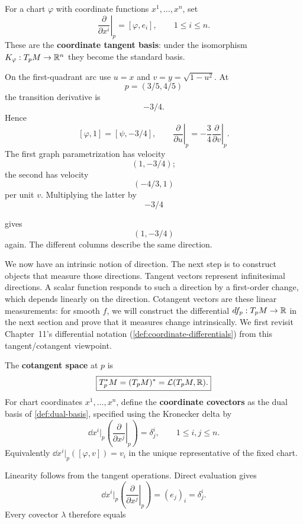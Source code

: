 
\begin{definition}
For a chart $\varphi$ with coordinate functions $x^1,\ldots,x^n$, set
\[
\left.\frac{\partial}{\partial x^i}\right|_p=[\varphi,e_i],\qquad 1\leq i\leq n.
\]
These are the \textbf{coordinate tangent basis}: under the isomorphism
$K_\varphi:T_pM\to\mathbb{R}^n$ they become the standard basis.
\end{definition}

\begin{example}
On the first-quadrant arc use $u=x$ and $v=y=\sqrt{1-u^2}$.
At
\[
p=(3/5,4/5)
\]
 the transition derivative is
\[
-3/4.
\]
 Hence
\[
[\varphi,1]=[\psi,-3/4],\qquad
\left.\frac{\partial}{\partial u}\right|_p
=-\frac34\left.\frac{\partial}{\partial v}\right|_p.
\]
The first graph parametrization has velocity
\[
(1,-3/4);
\]
 the second
has velocity
\[
(-4/3,1)
\]
 per unit $v$. Multiplying the latter by
\[
-3/4
\]

gives
\[
(1,-3/4)
\]
 again. The different columns describe the same direction.
\end{example}

We now have an intrinsic notion of direction. The next step is to
construct objects that measure those directions.
Tangent vectors represent infinitesimal directions. A scalar function
responds to such a direction by a first-order change, which depends
linearly on the direction. Cotangent vectors are these linear measurements:
for smooth $f$, we will construct the differential $df_p:T_pM\to\mathbb{R}$
in the next section and prove that it measures change intrinsically.
We first revisit Chapter~11's differential notation
(\cref{def:coordinate-differentials}) from this tangent/cotangent viewpoint.

\begin{definition}\label{def:cotangent-space}
The \textbf{cotangent space} at $p$ is
\[
\boxed{T_p^*M=(T_pM)^*=\mathcal L(T_pM,\mathbb{R}).}
\]
For chart coordinates $x^1,\ldots,x^n$, define the \textbf{coordinate
covectors} as the dual basis of \cref{def:dual-basis}, specified using
the Kronecker delta by
\[
\boxed{\dd x^i|_p\left(\left.\frac{\partial}{\partial x^j}\right|_p\right)
=\delta^i_j,\qquad 1\leq i,j\leq n.}
\]
Equivalently $\dd x^i|_p([\varphi,v])=v_i$ in the unique representative
of the fixed chart.
\end{definition}
Linearity follows from the tangent operations. Direct evaluation gives
\[
\dd x^i|_p\left(\left.\frac{\partial}{\partial x^j}\right|_p\right)
=(e_j)_i=\delta^i_j.
\]
Every covector $\lambda$ therefore equals

